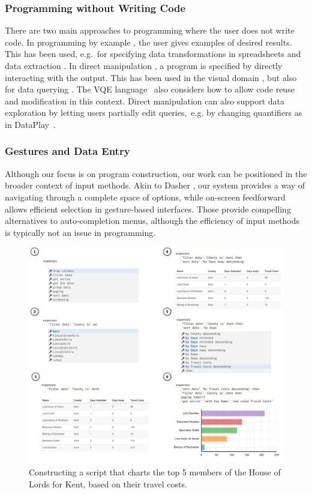 \documentclass[manuscript,review,anonymous]{acmart}
\begin{document}
\subsubsection*{Programming without Writing Code}
There are two main approaches to programming where
the user does not write code. In programming by example \cite{byexample}, the user gives
examples of desired results. This has been used, e.g.~for specifying data transformations
in spreadsheets and data extraction \cite{spreadsheetpbe,flashextract}.
In direct manipulation \cite{direct}, a program is specified by directly interacting with the
output. This has been used in the visual domain \cite{sketchnsketch}, but also for data querying
\cite{dynamicq,vlang}. The VQE language~\cite{visage} also considers how to allow code reuse and
modification in this context. Direct manipulation can also support data exploration by letting
users partially edit queries,~e.g. by changing quantifiers as in DataPlay~\cite{dataplay}.

\subsubsection*{Gestures and Data Entry}
Although our focus is on program construction, our work can be positioned in the
broader context of input methods. Akin to Dasher \cite{dasher}, our system provides a way of
navigating through a complete space of options, while on-screen feedforward \cite{octopocus} allows
efficient selection in gesture-based interfaces. Those provide compelling alternatives to
auto-completion menus, although the efficiency of input methods is typically not an issue in programming.


\begin{figure}[b]
\includegraphics[width=0.94\columnwidth]{figures/thegamma-walk}
\caption{Constructing a script that charts the top 5 members of the House of Lords for Kent, based
on their travel costs.}
\label{fig:walkthrough}
\end{figure}
\end{document}
